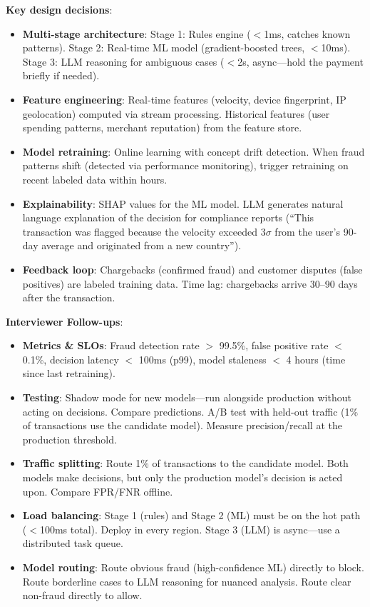 \textbf{Key design decisions}:
\begin{itemize}[leftmargin=*]
    \item \textbf{Multi-stage architecture}: Stage 1: Rules engine ($<$1ms, catches known patterns). Stage 2: Real-time ML model (gradient-boosted trees, $<$10ms). Stage 3: LLM reasoning for ambiguous cases ($<$2s, async---hold the payment briefly if needed).
    \item \textbf{Feature engineering}: Real-time features (velocity, device fingerprint, IP geolocation) computed via stream processing. Historical features (user spending patterns, merchant reputation) from the feature store.
    \item \textbf{Model retraining}: Online learning with concept drift detection. When fraud patterns shift (detected via performance monitoring), trigger retraining on recent labeled data within hours.
    \item \textbf{Explainability}: SHAP values for the ML model. LLM generates natural language explanation of the decision for compliance reports (``This transaction was flagged because the velocity exceeded 3$\sigma$ from the user's 90-day average and originated from a new country'').
    \item \textbf{Feedback loop}: Chargebacks (confirmed fraud) and customer disputes (false positives) are labeled training data. Time lag: chargebacks arrive 30--90 days after the transaction.
\end{itemize}

\textbf{Interviewer Follow-ups}:
\begin{itemize}[leftmargin=*]
    \item \textbf{Metrics \& SLOs}: Fraud detection rate $>$ 99.5\%, false positive rate $<$ 0.1\%, decision latency $<$ 100ms (p99), model staleness $<$ 4 hours (time since last retraining).
    \item \textbf{Testing}: Shadow mode for new models---run alongside production without acting on decisions. Compare predictions. A/B test with held-out traffic (1\% of transactions use the candidate model). Measure precision/recall at the production threshold.
    \item \textbf{Traffic splitting}: Route 1\% of transactions to the candidate model. Both models make decisions, but only the production model's decision is acted upon. Compare FPR/FNR offline.
    \item \textbf{Load balancing}: Stage 1 (rules) and Stage 2 (ML) must be on the hot path ($<$100ms total). Deploy in every region. Stage 3 (LLM) is async---use a distributed task queue.
    \item \textbf{Model routing}: Route obvious fraud (high-confidence ML) directly to block. Route borderline cases to LLM reasoning for nuanced analysis. Route clear non-fraud directly to allow.
\end{itemize}

